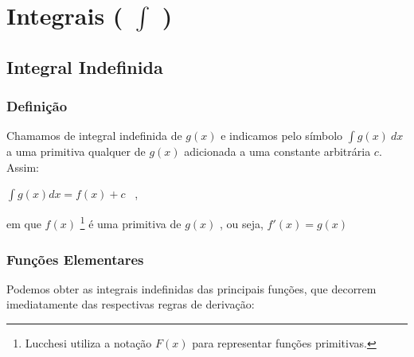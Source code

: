 \section{Integrais ( $\int$ )}

	\subsection{Integral Indefinida \cite{morettin}}

		\subsubsection{Definição \cite{morettin}}
	
			Chamamos de integral indefinida de $ g(x) $ e indicamos pelo símbolo $ \int g(x) \ dx $ a uma primitiva qualquer de $ g(x) $ adicionada a uma constante arbitrária $ c $. Assim:
			
			\bigskip
	
			{\LARGE $\int g(x)dx = f(x) + c $} \ ,
			
			\bigskip
	
			em que $ f(x) $ \footnote{Lucchesi \cite{lucchesi} utiliza a notação $ F(x) $ para representar funções primitivas.} é uma primitiva de $ g(x) $ , ou seja, $ f'(x) = g(x) $ \cite{morettin}
	
		\subsubsection{Funções Elementares \cite{morettin}}
	
			Podemos obter as integrais indefinidas das principais funções, que decorrem imediatamente das respectivas regras de derivação:
	
